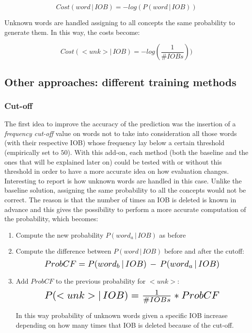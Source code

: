 \documentclass[11pt,a4paper]{article}
\begin{document}
	\[Cost(word\,|\,IOB)=-log(P(word\,|\,IOB)) \]
	
	Unknown words are handled assigning to all concepts the same probability to generate them. In this way, the costs become:

	\[Cost(<unk>|\,IOB)=-log(\frac{1}{\#IOBs})) \]	

\subsection{Other approaches: different training methods}
\label{ssec:otherapp}



\subsubsection{Cut-off}

The first idea to improve the accuracy of the prediction was the insertion of a \textit{frequency cut-off} value on words not to take into consideration all those words (with their respective IOB) whose frequency lay below a certain threshold (empirically set to $50$). With this add-on, each method (both the baseline and the ones that will be explained later on) could be tested with or without this threshold in order to have a more accurate idea on how evaluation changes.\\

Interesting to report is how unknown words are handled in this case. Unlike the baseline solution, assigning the same probability to all the concepts would not be correct. The reason is that the number of times an IOB is deleted is known in advance and this gives the possibility to perform a more accurate computation of the probability, which becomes:
\begin{enumerate}
	\item Compute the new probability $P(word_a\,|\,IOB)$ as before
	\item Compute the difference between $P(word\,|\,IOB)$ before and after the cutoff:
		\begin{equation}
			\resizebox{.75\hsize}{!}{$ProbCF=P(word_b\,|\,IOB)\,-\,P(word_a\,|\,IOB)$}
		\end{equation}
	\item Add $ProbCF$ to the previous probability for \textit{$<unk>$}:
		\begin{equation}
			\resizebox{.75\hsize}{!}{$P(<unk>|\,IOB)=\frac{1}{\#IOBs}*ProbCF$}
		\end{equation}
		
		In this way probability of unknown words given a specific IOB increase depending on how many times that IOB is deleted because of the cut-off.
\end{enumerate}
\end{document}
